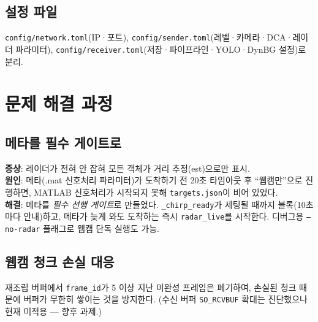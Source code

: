 \section{설정 파일}
\texttt{config/network.toml}(IP·포트), \texttt{config/sender.toml}(레벨·카메라·DCA·레이더
파라미터), \texttt{config/receiver.toml}(저장·파이프라인·YOLO·DynBG 설정)로 분리.

\chapter{문제 해결 과정}

\section{메타를 필수 게이트로}
\textbf{증상}: 레이더가 전혀 안 잡혀 모든 객체가 거리 추정(est)으로만 표시.\\
\textbf{원인}: 메타(.mat 신호처리 파라미터)가 도착하기 전 20초 타임아웃 후
``웹캠만''으로 진행하면, MATLAB 신호처리가 시작되지 못해 \texttt{targets.json}이
비어 있었다.\\
\textbf{해결}: 메타를 \emph{필수 선행 게이트}로 만들었다. \texttt{\_chirp\_ready}가
세팅될 때까지 블록(10초마다 안내)하고, 메타가 늦게 와도 도착하는 즉시
\texttt{radar\_live}를 시작한다. 디버그용 \texttt{--no-radar} 플래그로 웹캠 단독
실행도 가능.

\section{웹캠 청크 손실 대응}
재조립 버퍼에서 \texttt{frame\_id}가 5 이상 지난 미완성 프레임은 폐기하여, 손실된
청크 때문에 버퍼가 무한히 쌓이는 것을 방지한다. (수신 버퍼 \texttt{SO\_RCVBUF}
확대는 진단했으나 현재 미적용 — 향후 과제.)
